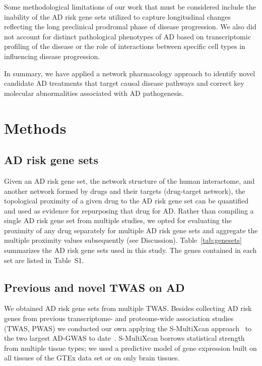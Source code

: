 \documentclass[letterpaper]{article}
\begin{document}
Some methodological limitations of our work that must be considered include
the inability of the AD risk gene sets utilized to capture longitudinal changes
reflecting the long preclinical prodromal phase of disease progression. We
also did not account for distinct pathological phenotypes of AD based on
transcriptomic profiling of the disease or the role of interactions between
specific cell types in influencing disease progression. 

In summary, we have applied a network pharmacology approach to identify novel
candidate AD treatments that target causal disease pathways and correct key
molecular abnormalities associated with AD pathogenesis.


\section{Methods}

\subsection{AD risk gene sets}

Given an AD risk gene set, the network structure of the human interactome, and
another network formed by drugs and their targets (drug-target network), the
topological proximity of a given drug to the AD risk gene set can be
quantified\citep{Guney2016} and used as evidence for repurposing that drug for
AD.  Rather than compiling a single AD risk gene set from multiple studies, we
opted for evaluating the proximity of any drug separately for multiple AD risk gene
sets and aggregate the multiple proximity values subsequently (see
Discussion).  Table~\ref{tab:genesets} summarizes the AD risk gene sets used in
this study.  The genes contained in each set are listed in Table~S1.

\subsection{Previous and novel TWAS on AD}

We obtained AD risk gene sets from multiple TWAS.  Besides collecting AD risk genes from
previous transcriptome- and proteome-wide association studies (TWAS, PWAS) we
conducted our own applying the S-MultiXcan approach~\citep{Barbeira2018} to
the two largest AD-GWAS to date~\citep{Schwartzentruber2021,Wightman2021}.
S-MultiXcan borrows statistical strength from multiple tissue types; we used a
predictive model of gene expression built on all tissues of the GTEx data set
or on only brain tissues.
\end{document}
